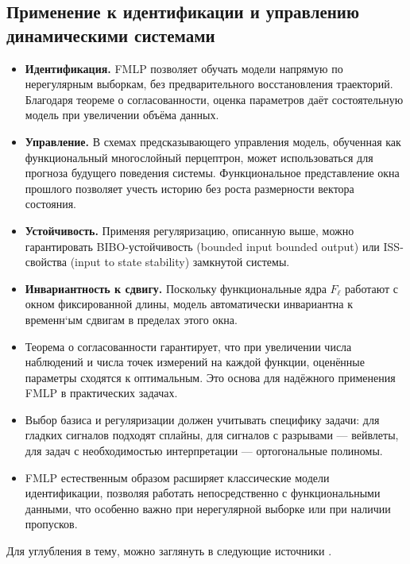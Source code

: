 \documentclass[../NDCNNAI_main.tex]{subfiles}
\begin{document}
\subsection{Применение к идентификации и управлению динамическими системами}
\begin{itemize}
    \item \textbf{Идентификация.} FMLP позволяет обучать модели напрямую по нерегулярным выборкам, без предварительного восстановления траекторий. 
    Благодаря теореме о согласованности, оценка параметров даёт состоятельную модель при увеличении объёма данных.
    \item \textbf{Управление.} В схемах предсказывающего управления модель, обученная как функциональный многослойный перцептрон, может использоваться для прогноза будущего поведения системы. 
    Функциональное представление окна прошлого позволяет учесть историю без роста размерности вектора состояния.
    \item \textbf{Устойчивость.} Применяя регуляризацию, описанную выше, можно гарантировать BIBO-устойчивость (bounded input bounded output) или ISS-свойства (input to state stability) замкнутой системы.
    \item \textbf{Инвариантность к сдвигу.} Поскольку функциональные ядра $F_\ell$ работают с окном фиксированной длины, модель автоматически инвариантна к временн`ым сдвигам в пределах этого окна.
\end{itemize}

\begin{remarks}
    \leavevmode
    \begin{itemize}
        \item Теорема о согласованности гарантирует, что при увеличении числа наблюдений и числа точек измерений на каждой функции, оценённые параметры сходятся к оптимальным. 
        Это основа для надёжного применения FMLP в практических задачах.
        \item Выбор базиса и регуляризации должен учитывать специфику задачи: для гладких сигналов подходят сплайны, для сигналов с разрывами --- вейвлеты, для задач с необходимостью интерпретации --- ортогональные полиномы.
        \item FMLP естественным образом расширяет классические модели идентификации, позволяя работать непосредственно с функциональными данными, что особенно важно при нерегулярной выборке или при наличии пропусков.
    \end{itemize}
\end{remarks}

Для углубления в тему, можно заглянуть в следующие источники \cite{Rossi2005, Stinchcombe1999, Hornik1991, Ramsay2005}.
\end{document}
